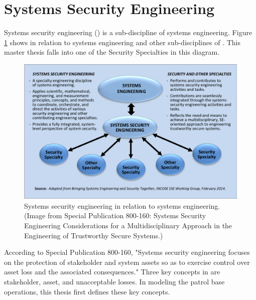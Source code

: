 \documentclass[../../main/main.tex]{subfiles}
\begin{document}
\section{Systems Security Engineering}\label{sec:sse} 
Systems security engineering () is a sub-discipline of systems engineering.  Figure \ref{fig:nist800160} shows  in relation to systems engineering and other sub-disciplines of .  This master thesis falls into one of the Security Specialties in this diagram.

\begin{figure}[h]
\includegraphics[width=\linewidth]{../figures/seincontext.png}
\caption{\label{fig:nist800160}Systems security engineering in relation to systems engineering. (Image from  Special Publication 800-160: Systems Security Engineering Considerations for a Multidisciplinary Approach in the Engineering of Trustworthy Secure Systems.)}
\end{figure}

According to  Special Publication 800-160, "Systems security engineering focuses on the protection of stakeholder and system assets so as to exercise control over asset loss and the associated consequences."  Three key concepts in  are stakeholder, asset, and unacceptable losses.  In modeling the patrol base operations, this thesis first defines these key concepts.  
\end{document}
